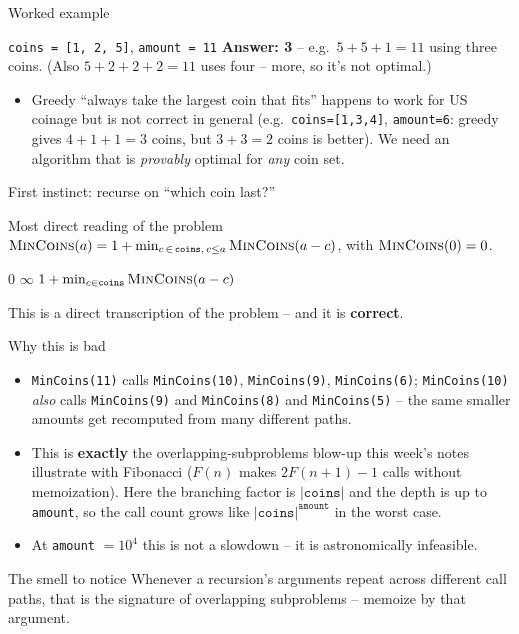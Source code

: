 \documentclass[11pt,aspectratio=169]{beamer}
\begin{document}
\begin{frame}{Worked example}
  \begin{block}{\texttt{coins = [1, 2, 5]}, \texttt{amount = 11}}
    \textbf{Answer: 3} -- e.g.\ $5+5+1 = 11$ using three coins. (Also $5+2+2+2=11$ uses
    four -- more, so it's not optimal.)
  \end{block}
  \begin{itemize}
    \item Greedy ``always take the largest coin that fits'' happens to work for US
    coinage but is not correct in general (e.g.\ \texttt{coins=[1,3,4]},
    \texttt{amount=6}: greedy gives $4+1+1=3$ coins, but $3+3=2$ coins is better). We
    need an algorithm that is \emph{provably} optimal for \emph{any} coin set.
  \end{itemize}
\end{frame}

\begin{frame}{First instinct: recurse on ``which coin last?''}
  \begin{block}{Most direct reading of the problem}
    $\textsc{MinCoins}(a) = 1 + \min_{c \,\in\, \texttt{coins},\, c \le a}
    \textsc{MinCoins}(a-c)$, with $\textsc{MinCoins}(0)=0$.
  \end{block}
  \begin{algorithmic}[1]
       \Return $0$ \EndIf
       \Return $\infty$ \EndIf
      \State \Return $1 + \min_{c \in \texttt{coins}} \Call{MinCoins}{a - c}$
    \EndFunction
  \end{algorithmic}
  This is a direct transcription of the problem -- and it is \textbf{correct}.
\end{frame}

\begin{frame}{Why this is bad}
  \begin{itemize}
    \item \texttt{MinCoins(11)} calls \texttt{MinCoins(10)}, \texttt{MinCoins(9)},
    \texttt{MinCoins(6)}; \texttt{MinCoins(10)} \emph{also} calls \texttt{MinCoins(9)}
    and \texttt{MinCoins(8)} and \texttt{MinCoins(5)} -- the same smaller amounts get
    recomputed from many different paths.
    \item This is \textbf{exactly} the overlapping-subproblems blow-up this week's
    notes illustrate with Fibonacci ($F(n)$ makes $2F(n+1)-1$ calls without
    memoization). Here the branching factor is $|\texttt{coins}|$ and the depth is up
    to \texttt{amount}, so the call count grows like $|\texttt{coins}|^{\texttt{amount}}$
    in the worst case.
    \item At \texttt{amount} $=10^4$ this is not a slowdown -- it is astronomically
    infeasible.
  \end{itemize}
  \begin{alertblock}{The smell to notice}
    Whenever a recursion's arguments repeat across different call paths, that is the
    signature of overlapping subproblems -- memoize by that argument.
  \end{alertblock}
\end{frame}
\end{document}
